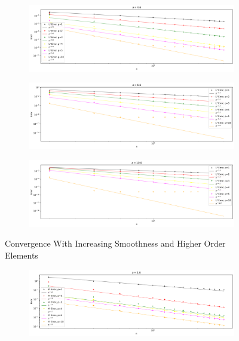 \documentclass[11pt,a4paper]{article}
\begin{document}
\begin{multicols}{2}
\begin{figure}[H]
  \begin{subfigure}{1\linewidth}
    \centering
    \includegraphics[width=.8\linewidth]{errors_ridge_46_l2}
  \end{subfigure}

  \begin{subfigure}{1\linewidth}
    \centering
    \includegraphics[width=.8\linewidth]{errors_ridge_66_l2}
  \end{subfigure}

  \begin{subfigure}{1\linewidth}
    \centering
    \includegraphics[width=.8\linewidth]{errors_ridge_106_l2}
  \end{subfigure}

  \caption{Convergence With Increasing Smoothness and Higher Order Elements}
  \label{fig:err_ridge_l2}
\end{figure}


\begin{figure}[H]
  \centering
  \begin{subfigure}{1\linewidth}
    \centering
    \includegraphics[width=.8\linewidth]{errors_ridge_26_h1}
  \end{subfigure}


\end{figure}
\end{multicols}
\end{document}
